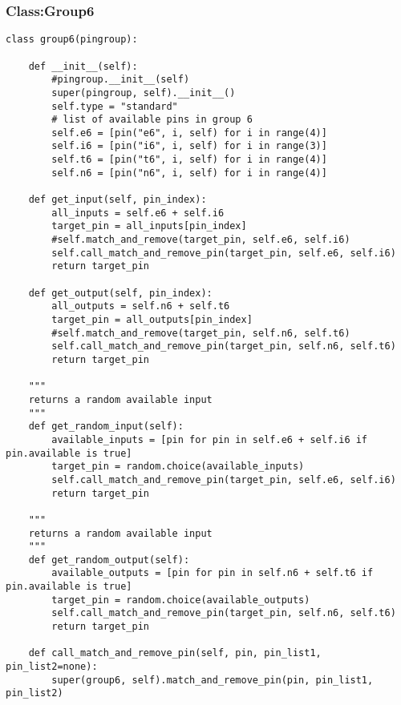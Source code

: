 \documentclass[a4paper]{article}
\begin{document}
\subsubsection{Class:Group6}
\label{sec-4-5-6}
\begin{verbatim}
class group6(pingroup):

    def __init__(self):
        #pingroup.__init__(self)
        super(pingroup, self).__init__()
        self.type = "standard"
        # list of available pins in group 6
        self.e6 = [pin("e6", i, self) for i in range(4)]
        self.i6 = [pin("i6", i, self) for i in range(3)]
        self.t6 = [pin("t6", i, self) for i in range(4)]
        self.n6 = [pin("n6", i, self) for i in range(4)]

    def get_input(self, pin_index):
        all_inputs = self.e6 + self.i6
        target_pin = all_inputs[pin_index]
        #self.match_and_remove(target_pin, self.e6, self.i6)
        self.call_match_and_remove_pin(target_pin, self.e6, self.i6)
        return target_pin

    def get_output(self, pin_index):
        all_outputs = self.n6 + self.t6
        target_pin = all_outputs[pin_index]
        #self.match_and_remove(target_pin, self.n6, self.t6)
        self.call_match_and_remove_pin(target_pin, self.n6, self.t6)
        return target_pin

    """
    returns a random available input
    """
    def get_random_input(self):
        available_inputs = [pin for pin in self.e6 + self.i6 if pin.available is true]
        target_pin = random.choice(available_inputs)
        self.call_match_and_remove_pin(target_pin, self.e6, self.i6)
        return target_pin

    """
    returns a random available input
    """
    def get_random_output(self):
        available_outputs = [pin for pin in self.n6 + self.t6 if pin.available is true]
        target_pin = random.choice(available_outputs)
        self.call_match_and_remove_pin(target_pin, self.n6, self.t6)
        return target_pin

    def call_match_and_remove_pin(self, pin, pin_list1, pin_list2=none):
        super(group6, self).match_and_remove_pin(pin, pin_list1, pin_list2)
\end{verbatim}
\end{document}
